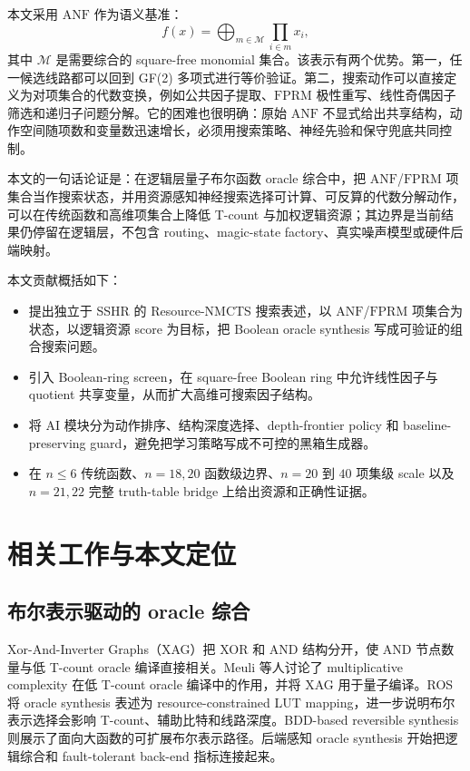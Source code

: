 \documentclass[UTF8,fontset=macnew,11pt]{ctexart}
\newcommand{\method}{Resource-NMCTS}
\newcommand{\screen}{Boolean-ring screen}
\newcommand{\anf}{\ensuremath{\mathrm{ANF}}}
\newcommand{\fprm}{\ensuremath{\mathrm{FPRM}}}
\newcommand{\ttable}{truth-table}
\begin{document}
本文采用 \anf{} 作为语义基准：
\begin{equation}
  f(x)=\bigoplus_{m\in\mathcal{M}}\prod_{i\in m}x_i ,
  \label{eq:anf}
\end{equation}
其中 $\mathcal{M}$ 是需要综合的 square-free monomial 集合。该表示有两个优势。第一，任一候选线路都可以回到 GF(2) 多项式进行等价验证。第二，搜索动作可以直接定义为对项集合的代数变换，例如公共因子提取、\fprm{} 极性重写、线性奇偶因子筛选和递归子问题分解。它的困难也很明确：原始 \anf{} 不显式给出共享结构，动作空间随项数和变量数迅速增长，必须用搜索策略、神经先验和保守兜底共同控制。

本文的一句话论证是：在逻辑层量子布尔函数 oracle 综合中，把 \anf{}/\fprm{} 项集合当作搜索状态，并用资源感知神经搜索选择可计算、可反算的代数分解动作，可以在传统函数和高维项集合上降低 T-count 与加权逻辑资源；其边界是当前结果仍停留在逻辑层，不包含 routing、magic-state factory、真实噪声模型或硬件后端映射。

本文贡献概括如下：
\begin{itemize}
  \item 提出独立于 SSHR 的 \method{} 搜索表述，以 \anf{}/\fprm{} 项集合为状态，以逻辑资源 score 为目标，把 Boolean oracle synthesis 写成可验证的组合搜索问题。
  \item 引入 \screen{}，在 square-free Boolean ring 中允许线性因子与 quotient 共享变量，从而扩大高维可搜索因子结构。
  \item 将 AI 模块分为动作排序、结构深度选择、depth-frontier policy 和 baseline-preserving guard，避免把学习策略写成不可控的黑箱生成器。
  \item 在 $n\leq6$ 传统函数、$n=18,20$ 函数级边界、$n=20$ 到 $40$ 项集级 scale 以及 $n=21,22$ 完整 \ttable{} bridge 上给出资源和正确性证据。
\end{itemize}

\section{相关工作与本文定位}

\subsection{布尔表示驱动的 oracle 综合}

Xor-And-Inverter Graphs（XAG）把 XOR 和 AND 结构分开，使 AND 节点数量与低 T-count oracle 编译直接相关。Meuli 等人讨论了 multiplicative complexity 在低 T-count oracle 编译中的作用\cite{meuli2019multiplicative}，并将 XAG 用于量子编译\cite{meuli2022xag}。ROS 将 oracle synthesis 表述为 resource-constrained LUT mapping\cite{meuli2020ros}，进一步说明布尔表示选择会影响 T-count、辅助比特和线路深度。BDD-based reversible synthesis 则展示了面向大函数的可扩展布尔表示路径\cite{wille2009bdd}。后端感知 oracle synthesis 开始把逻辑综合和 fault-tolerant back-end 指标连接起来\cite{yu2025backend}。
\end{document}
